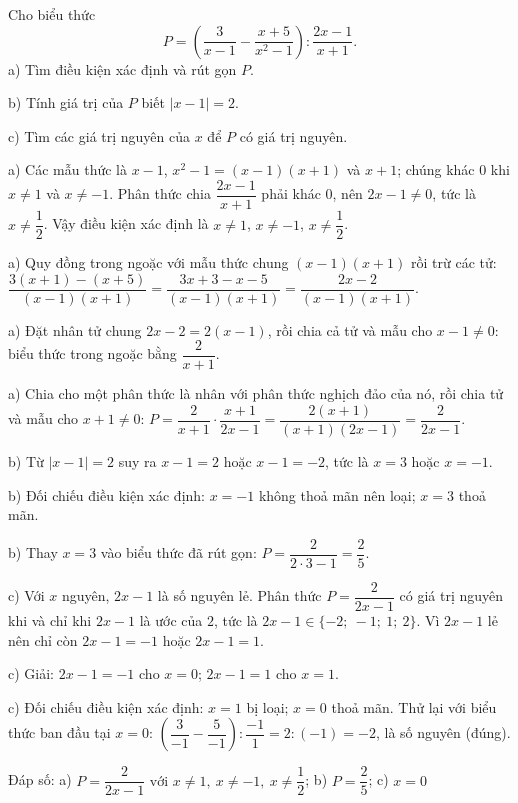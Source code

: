 \begin{problem}[8DS-PS-045]
Cho biểu thức
\[ P = \left(\dfrac{3}{x - 1} - \dfrac{x + 5}{x^2 - 1}\right) : \dfrac{2x - 1}{x + 1}. \]
a) Tìm điều kiện xác định và rút gọn $P$.

b) Tính giá trị của $P$ biết $|x - 1| = 2$.

c) Tìm các giá trị nguyên của $x$ để $P$ có giá trị nguyên.

\begin{solution}
a) Các mẫu thức là $x - 1$, $x^2 - 1 = (x - 1)(x + 1)$ và $x + 1$; chúng khác $0$ khi $x \neq 1$ và $x \neq -1$. Phân thức chia $\dfrac{2x - 1}{x + 1}$ phải khác $0$, nên $2x - 1 \neq 0$, tức là $x \neq \dfrac{1}{2}$. Vậy điều kiện xác định là $x \neq 1$, $x \neq -1$, $x \neq \dfrac{1}{2}$.

a) Quy đồng trong ngoặc với mẫu thức chung $(x - 1)(x + 1)$ rồi trừ các tử: $\dfrac{3(x + 1) - (x + 5)}{(x - 1)(x + 1)} = \dfrac{3x + 3 - x - 5}{(x - 1)(x + 1)} = \dfrac{2x - 2}{(x - 1)(x + 1)}$.

a) Đặt nhân tử chung $2x - 2 = 2(x - 1)$, rồi chia cả tử và mẫu cho $x - 1 \neq 0$: biểu thức trong ngoặc bằng $\dfrac{2}{x + 1}$.

a) Chia cho một phân thức là nhân với phân thức nghịch đảo của nó, rồi chia tử và mẫu cho $x + 1 \neq 0$: $P = \dfrac{2}{x + 1} \cdot \dfrac{x + 1}{2x - 1} = \dfrac{2(x + 1)}{(x + 1)(2x - 1)} = \dfrac{2}{2x - 1}$.

b) Từ $|x - 1| = 2$ suy ra $x - 1 = 2$ hoặc $x - 1 = -2$, tức là $x = 3$ hoặc $x = -1$.

b) Đối chiếu điều kiện xác định: $x = -1$ không thoả mãn nên loại; $x = 3$ thoả mãn.

b) Thay $x = 3$ vào biểu thức đã rút gọn: $P = \dfrac{2}{2 \cdot 3 - 1} = \dfrac{2}{5}$.

c) Với $x$ nguyên, $2x - 1$ là số nguyên lẻ. Phân thức $P = \dfrac{2}{2x - 1}$ có giá trị nguyên khi và chỉ khi $2x - 1$ là ước của $2$, tức là $2x - 1 \in \{-2;\ -1;\ 1;\ 2\}$. Vì $2x - 1$ lẻ nên chỉ còn $2x - 1 = -1$ hoặc $2x - 1 = 1$.

c) Giải: $2x - 1 = -1$ cho $x = 0$; $2x - 1 = 1$ cho $x = 1$.

c) Đối chiếu điều kiện xác định: $x = 1$ bị loại; $x = 0$ thoả mãn. Thử lại với biểu thức ban đầu tại $x = 0$: $\left(\dfrac{3}{-1} - \dfrac{5}{-1}\right) : \dfrac{-1}{1} = 2 : (-1) = -2$, là số nguyên (đúng).

Đáp số: a) $\boxed{P = \dfrac{2}{2x - 1} \text{ với } x \neq 1,\ x \neq -1,\ x \neq \dfrac{1}{2}}$; b) $\boxed{P = \dfrac{2}{5}}$; c) $\boxed{x = 0}$
\end{solution}
\end{problem}

